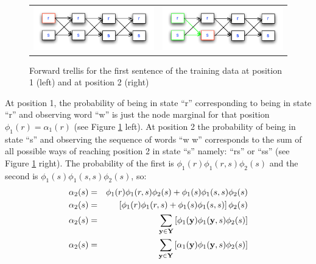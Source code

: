 \begin{figure}
\begin{center}
\begin{tabular}{cc}

\includegraphics[scale=.5]{figs/sequences/forward1}
& \includegraphics[scale=.5]{figs/sequences/forward2}\\
\end{tabular}
\caption[Forward backward example.]{\label{fig:fb} Forward trellis for
  the first sentence of the training data at position 1 (left) and at
  position 2 (right)}

\end{center}
\end{figure}

At position 1, the probability of being in state ``r'' corresponding
to being in state ``r'' and observing word ``w'' is just the node
marginal for that position $\phi_1(r) = \alpha_1(r)$ (see Figure
 \ref{fig:fb} left). At position 2 the probability
of being in state ``s'' and observing the sequence of words ``w w''
corresponds to the sum of all possible ways of reaching position 2 in
state ``s'' namely: ``rs'' or ``ss'' (see Figure \ref{fig:fb} right). The probability of the first is
$\phi_1(r)\phi_1(r,s)\phi_2(s)$
and the second is $\phi_1(s)\phi_1(s,s)\phi_2(s)$, so:
\begin{eqnarray*}
   \alpha_2(s) &=& \phi_1(r)\phi_1(r,s)\phi_2(s) +
   \phi_1(s)\phi_1(s,s)\phi_2(s) \\
   \alpha_2(s) &=& \left[\phi_1(r)\phi_1(r,s) +
   \phi_1(s)\phi_1(s,s) \right]\phi_2(s) \\
 \alpha_2(s) &=& \displaystyle \sum_{\mathbf{y} \in \mathbf{Y}}
 \left[\phi_1(\mathbf{y})\phi_1(\mathbf{y},s)\phi_2(s) \right] \\
  \alpha_2(s) &=& \displaystyle \sum_{\mathbf{y} \in \mathbf{Y}}
 \left[\alpha_1(\mathbf{y})\phi_1(\mathbf{y},s)\phi_2(s) \right]
\end{eqnarray*}

